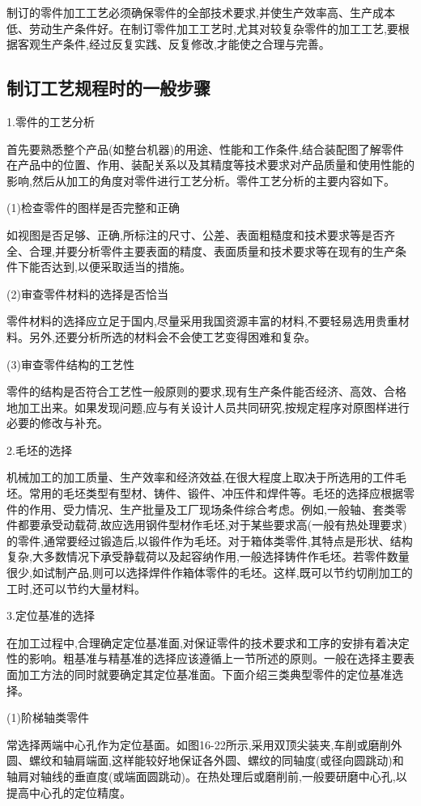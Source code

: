 \documentclass[UTF8]{ctexbook}
\newcommand{\◎}{\ensuremath{\bigcirc}}
\begin{document}
制订的零件加工工艺必须确保零件的全部技术要求,并使生产效率高、生产成本低、劳动生产条件好。在制订零件加工工艺时,尤其对较复杂零件的加工工艺,要根据客观生产条件,经过反复实践、反复修改,才能使之合理与完善。

\subsection{制订工艺规程时的一般步骤}
1.零件的工艺分析

首先要熟悉整个产品(如整台机器)的用途、性能和工作条件,结合装配图了解零件在产品中的位置、作用、装配关系以及其精度等技术要求对产品质量和使用性能的影响,然后从加工的角度对零件进行工艺分析。零件工艺分析的主要内容如下。

(1)检查零件的图样是否完整和正确

如视图是否足够、正确,所标注的尺寸、公差、表面粗糙度和技术要求等是否齐全、合理,并要分析零件主要表面的精度、表面质量和技术要求等在现有的生产条件下能否达到,以便采取适当的措施。

(2)审查零件材料的选择是否恰当

零件材料的选择应立足于国内,尽量采用我国资源丰富的材料,不要轻易选用贵重材料。另外,还要分析所选的材料会不会使工艺变得困难和复杂。

(3)审查零件结构的工艺性

零件的结构是否符合工艺性一般原则的要求,现有生产条件能否经济、高效、合格地加工出来。如果发现问题,应与有关设计人员共同研究,按规定程序对原图样进行必要的修改与补充。

2.毛坯的选择

机械加工的加工质量、生产效率和经济效益,在很大程度上取决于所选用的工件毛坯。常用的毛坯类型有型材、铸件、锻件、冲压件和焊件等。毛坯的选择应根据零件的作用、受力情况、生产批量及工厂现场条件综合考虑。例如,一般轴、套类零件都要承受动载荷,故应选用钢件型材作毛坯,对于某些要求高(一般有热处理要求)的零件,通常要经过锻造后,以锻件作为毛坯。对于箱体类零件,其特点是形状、结构复杂,大多数情况下承受静载荷以及起容纳作用,一般选择铸件作毛坯。若零件数量很少,如试制产品,则可以选择焊件作箱体零件的毛坯。这样,既可以节约切削加工的工时,还可以节约大量材料。

3.定位基准的选择

在加工过程中,合理确定定位基准面,对保证零件的技术要求和工序的安排有着决定性的影响。粗基准与精基准的选择应该遵循上一节所述的原则。一般在选择主要表面加工方法的同时就要确定其定位基准面。下面介绍三类典型零件的定位基准选择。

(1)阶梯轴类零件

常选择两端中心孔作为定位基面。如图16-22所示,采用双顶尖装夹,车削或磨削外圆、螺纹和轴肩端面,这样能较好地保证各外圆、螺纹的同轴度(或径向圆跳动)和轴肩对轴线的垂直度(或端面圆跳动)。在热处理后或磨削前,一般要研磨中心孔,以提高中心孔的定位精度。
\end{document}
